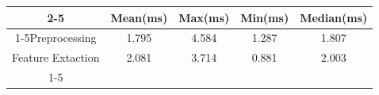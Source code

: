 \documentclass{standalone}
\begin{document}
 
 \begin{tabular}{|c |c |c |c |c |}
\cline{2-5}\cline{2-5} \multicolumn{1}{c |}{ } & Mean(ms) & Max(ms) & Min(ms) & Median(ms)\\ 
\cline{1-5}Preprocessing & 1.795 & 4.584 & 1.287 & 1.807\\ 
 \hhline{|=|=|=|=|=|}Feature Extaction & 2.081 & 3.714 & 0.881 & 2.003\\ 
 \cline{1-5}\hline \end{tabular}
 
\end{document}
